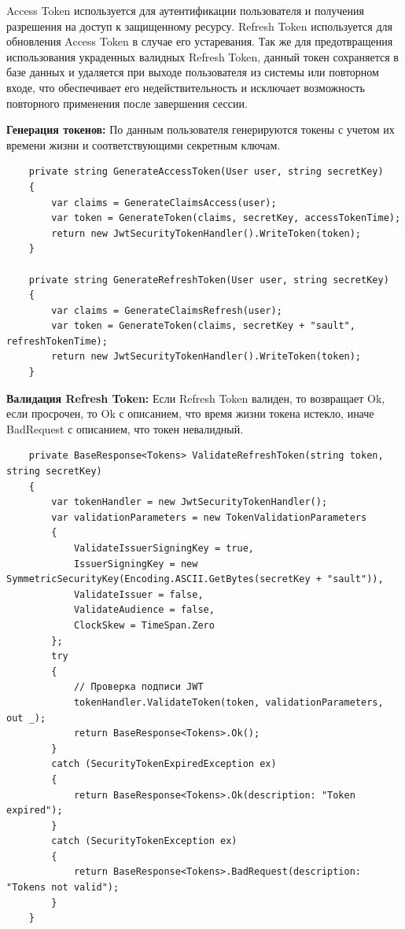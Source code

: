 Access Token используется для аутентификации пользователя и получения разрешения на доступ к защищенному ресурсу. Refresh Token используется для обновления Access Token в случае его устаревания. Так же для предотвращения использования украденных валидных Refresh Token, данный токен сохраняется в базе данных и удаляется при выходе пользователя из системы или повторном входе, что обеспечивает его недействительность и исключает возможность повторного применения после завершения сессии.

\textbf{Генерация токенов:} По данным пользователя генерируются токены с учетом их времени жизни и соответствующими секретным ключам.
\begin{verbatim}
    private string GenerateAccessToken(User user, string secretKey)
    {
        var claims = GenerateClaimsAccess(user);
        var token = GenerateToken(claims, secretKey, accessTokenTime);
        return new JwtSecurityTokenHandler().WriteToken(token);
    }

    private string GenerateRefreshToken(User user, string secretKey)
    {
        var claims = GenerateClaimsRefresh(user);
        var token = GenerateToken(claims, secretKey + "sault", refreshTokenTime);
        return new JwtSecurityTokenHandler().WriteToken(token);
    }
\end{verbatim}

\textbf{Валидация Refresh Token:} Если Refresh Token валиден, то возвращает Ok, если просрочен, то Ok с описанием, что время жизни токена истекло, иначе BadRequest с описанием, что токен невалидный.
\begin{verbatim}
    private BaseResponse<Tokens> ValidateRefreshToken(string token, string secretKey)
    {
        var tokenHandler = new JwtSecurityTokenHandler();
        var validationParameters = new TokenValidationParameters
        {
            ValidateIssuerSigningKey = true,
            IssuerSigningKey = new SymmetricSecurityKey(Encoding.ASCII.GetBytes(secretKey + "sault")),
            ValidateIssuer = false,
            ValidateAudience = false,
            ClockSkew = TimeSpan.Zero
        };
        try
        {
            // Проверка подписи JWT
            tokenHandler.ValidateToken(token, validationParameters, out _);
            return BaseResponse<Tokens>.Ok();
        }
        catch (SecurityTokenExpiredException ex)
        {
            return BaseResponse<Tokens>.Ok(description: "Token expired");
        }
        catch (SecurityTokenException ex)
        {
            return BaseResponse<Tokens>.BadRequest(description: "Tokens not valid");
        }
    }
\end{verbatim}

